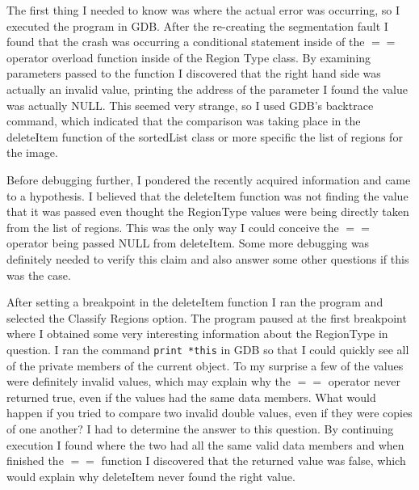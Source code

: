 \documentclass[pdftex, 11pt]{article}
\begin{document}
The first thing I needed to know was where the actual error was occurring, so I executed the program in GDB.  After the
re-creating the segmentation fault I found that the crash was occurring a conditional statement inside of the $==$
operator overload function inside of the Region Type class.  By examining parameters passed to the function I discovered
that the right hand side was actually an invalid value, printing the address of the parameter I found the value was
actually NULL.  This seemed very strange, so I used GDB's backtrace command, which indicated that the comparison was
taking place in the deleteItem function of the sortedList class or more specific the list of regions for the image.

Before debugging further, I pondered the recently acquired information and came to a hypothesis.  I believed that the
deleteItem function was not finding the value that it was passed even thought the RegionType values were being directly
taken from the list of regions.  This was the only way I could conceive the $==$ operator being passed NULL from
deleteItem.  Some more debugging was definitely needed to verify this claim and also answer some other questions if this
was the case.

After setting a breakpoint in the deleteItem function I ran the program and selected the Classify Regions option.  The
program paused at the first breakpoint where I obtained some very interesting information about the RegionType in
question.  I ran the command \texttt{print *this} in GDB so that I could quickly see all of the private members of the
current object.  To my surprise a few of the values were definitely invalid values, which may explain why the $==$
operator never returned true, even if the values had the same data members.  What would happen if you tried to compare
two invalid double values, even if they were copies of one another?  I had to determine the answer to this question.  By
continuing execution I found where the two had all the same valid data members and when finished the $==$ function I
discovered that the returned value was false, which would explain why deleteItem never found the right value.
\end{document}
